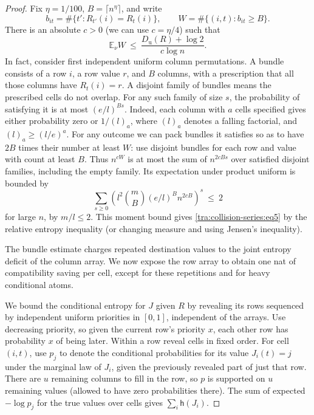 \begin{proof}
Fix \(\eta=1/100\), \(B=\lceil n^\eta\rceil\), and write
\[
b_{it}=\#\{t': R_{t'}(i)=R_t(i)\},\qquad W=\#\{(i,t): b_{it}\ge B\}.
\]
There is an absolute \(c>0\) (we can use \(c=\eta/4\)) such that
\begin{equation}
\mathbb E_\nu W\ \le\ \frac{D_\mathrm{u}(R)+\log 2}{c\log n}. \label{tra:collision-series:eq5}
\end{equation}
In fact, consider first independent uniform column permutations. A bundle consists of a row \(i\), a row value \(r\), and \(B\) columns, with a prescription that all those columns have \(R_t(i)=r\). A disjoint family of bundles means the prescribed cells do not overlap. For any such family of size \(s\), the probability of satisfying it is at most \((e/l)^{Bs}\). Indeed, each column with \(a\) cells specified gives either probability zero or \(1/(l)_a\), where \((l)_a\) denotes a falling factorial, and \((l)_a\ge (l/e)^a\). For any outcome we can pack bundles it satisfies so as to have \(2B\) times their number at least \(W\): use disjoint bundles for each row and value with count at least \(B\). Thus \(n^{c W}\) is at most the sum of \(n^{2cBs}\) over satisfied disjoint families, including the empty family. Its expectation under product uniform is bounded by
\[
\sum_{s\ge 0}\left(l^2 \binom mB (e/l)^B n^{2cB}\right)^s\ \le\ 2
\]
for large \(n\), by \(m/l\le 2\). This moment bound gives \eqref{tra:collision-series:eq5} by the relative entropy inequality (or changing measure and using Jensen's inequality).

The bundle estimate charges repeated destination values to the joint entropy deficit of the column array. We now expose the row array to obtain one nat of compatibility saving per cell, except for these repetitions and for heavy conditional atoms.

We bound the conditional entropy for \(J\) given \(R\) by revealing its rows sequenced by independent uniform priorities in \([0,1]\), independent of the arrays. Use decreasing priority, so given the current row's priority \(x\), each other row has probability \(x\) of being later. Within a row reveal cells in fixed order. For cell \((i,t)\), use \(p_j\) to denote the conditional probabilities for its value \(J_i(t)=j\) under the marginal law of \(J_i\), given the previously revealed part of just that row. There are \(u\) remaining columns to fill in the row, so \(p\) is supported on \(u\) remaining values (allowed to have zero probabilities there). The sum of expected \(-\log p_j\) for the true values over cells gives \(\sum_i\mathsf h(J_i)\).


\end{proof}
